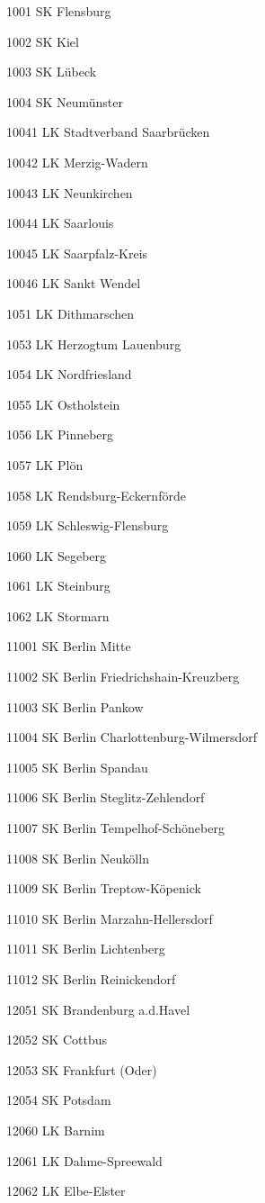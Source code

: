 1001  SK Flensburg

1002  SK Kiel

1003  SK Lübeck

1004  SK Neumünster

10041  LK Stadtverband Saarbrücken

10042  LK Merzig-Wadern

10043  LK Neunkirchen

10044  LK Saarlouis

10045  LK Saarpfalz-Kreis

10046  LK Sankt Wendel

1051  LK Dithmarschen

1053  LK Herzogtum Lauenburg

1054  LK Nordfriesland

1055  LK Ostholstein

1056  LK Pinneberg

1057  LK Plön

1058  LK Rendsburg-Eckernförde

1059  LK Schleswig-Flensburg

1060  LK Segeberg

1061  LK Steinburg

1062  LK Stormarn

11001  SK Berlin Mitte

11002  SK Berlin Friedrichshain-Kreuzberg

11003  SK Berlin Pankow

11004  SK Berlin Charlottenburg-Wilmersdorf

11005  SK Berlin Spandau

11006  SK Berlin Steglitz-Zehlendorf

11007  SK Berlin Tempelhof-Schöneberg

11008  SK Berlin Neukölln

11009  SK Berlin Treptow-Köpenick

11010  SK Berlin Marzahn-Hellersdorf

11011  SK Berlin Lichtenberg

11012  SK Berlin Reinickendorf

12051  SK Brandenburg a.d.Havel

12052  SK Cottbus

12053  SK Frankfurt (Oder)

12054  SK Potsdam

12060  LK Barnim

12061  LK Dahme-Spreewald

12062  LK Elbe-Elster

